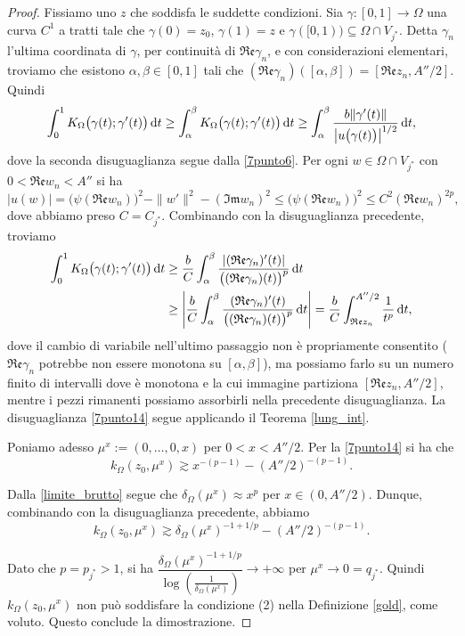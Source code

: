 \begin{proof}
    Fissiamo uno $z$ che soddisfa le suddette condizioni. Sia $\gamma:[0,1]\longrightarrow\Omega$ una curva $C^1$ a tratti tale che $\gamma(0)=z_0$, $\gamma(1)=z$ e $\gamma([0,1))\subseteq\Omega\cap V_{j^*}$. Detta $\gamma_n$ l'ultima coordinata di $\gamma$, per continuità di $\mathfrak{Re}\gamma_n$, e con considerazioni elementari, troviamo che esistono $\alpha,\beta\in[0,1]$ tali che $(\mathfrak{Re}\gamma_n)([\alpha,\beta])=[\mathfrak{Re}z_n,A''/2]$. Quindi
    $$\int_0^1 K_\Omega\big(\gamma(t);\gamma'(t)\big)\mathop{}\!\mathrm{d} t\ge\int_\alpha^\beta K_\Omega\big(\gamma(t);\gamma'(t)\big)\mathop{}\!\mathrm{d} t\ge \int_\alpha^\beta \frac{b\|\gamma'(t)\|}{\left|u\big(\gamma(t)\big)\right|^{1/2}}\mathop{}\!\mathrm{d} t,$$
    dove la seconda disuguaglianza segue dalla \eqref{7punto6}. Per ogni $w\in\Omega\cap V_{j^*}$ con $0<\mathfrak{Re}w_n<A''$ si ha
    $$|u(w)|=\big(\psi(\mathfrak{Re}w_n)\big)^2-\|w'\|^2-(\mathfrak{Im}w_n)^2 \le \big(\psi(\mathfrak{Re}w_n)\big)^2 \le C^2(\mathfrak{Re}w_n)^{2p},$$
    dove abbiamo preso $C=C_{j^*}$. Combinando con la disuguaglianza precedente, troviamo
    \begin{align*}
        \int_0^1 K_\Omega\big(\gamma(t);\gamma'(t)\big)\mathop{}\!\mathrm{d} t&\ge \frac{b}{C}\int_\alpha^\beta \frac{|(\mathfrak{Re}\gamma_n)'(t)|}{\big((\mathfrak{Re}\gamma_n)(t)\big)^p}\mathop{}\!\mathrm{d} t\\
        &\ge \left|\frac{b}{C}\int_\alpha^\beta \frac{(\mathfrak{Re}\gamma_n)'(t)}{\big((\mathfrak{Re}\gamma_n)(t)\big)^p}\mathop{}\!\mathrm{d} t\right|=\frac{b}{C}\int_{\mathfrak{Re}z_n}^{A''/2}\frac{1}{t^p}\mathop{}\!\mathrm{d} t,
    \end{align*}
    dove il cambio di variabile nell'ultimo passaggio non è propriamente consentito ($\mathfrak{Re}\gamma_n$ potrebbe non essere monotona su $[\alpha,\beta]$), ma possiamo farlo su un numero finito di intervalli dove è monotona e la cui immagine partiziona $[\mathfrak{Re}z_n,A''/2]$, mentre i pezzi rimanenti possiamo assorbirli nella precedente disuguaglianza. La disuguaglianza \eqref{7punto14} segue applicando il Teorema \ref{lung_int}.

    Poniamo adesso $\mu^x:=(0,\dots,0,x)$ per $0<x<A''/2$. Per la \eqref{7punto14} si ha che
    $$k_\Omega(z_0,\mu^x) \gtrsim x^{-(p-1)}-(A''/2)^{-(p-1)}.$$
    
    Dalla \eqref{limite_brutto} segue che $\delta_\Omega(\mu^x) \approx x^p$ per $x\in(0,A''/2)$. Dunque, combinando con la disuguaglianza precedente, abbiamo
    $$k_\Omega(z_0,\mu^x) \gtrsim \delta_\Omega(\mu^x)^{-1+1/p}-(A''/2)^{-(p-1)}.$$

    Dato che $p=p_{j^*}>1$, si ha $\dfrac{\delta_\Omega(\mu^x)^{-1+1/p}}{\log\left(\frac{1}{\delta_\Omega(\mu^x)}\right)}\longrightarrow +\infty$ per $\mu^x\longrightarrow 0=q_{j^*}$. Quindi $k_\Omega(z_0,\mu^x)$ non può soddisfare la condizione (2) nella Definizione \ref{gold}, come voluto. Questo conclude la dimostrazione.
\end{proof}

